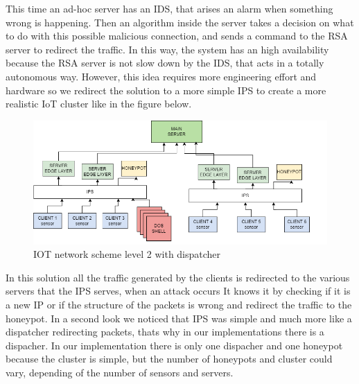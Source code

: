 This time an ad-hoc server has an IDS, that arises an alarm when something wrong is happening. Then an algorithm inside the server takes a decision on what to do with this possible malicious connection, and sends a command to the RSA server to redirect the traffic. In this way, the system has an high availability because the RSA server is not slow down by the IDS, that acts in a totally autonomous way. However, this idea requires more engineering effort and hardware so we redirect the solution to a more simple IPS to create a more realistic IoT cluster like in the figure below. 
\begin{figure}[h!]
  \centering
  \includegraphics[width = 15cm]{images/IOTlevel2IPS.drawio.png}
  \caption{IOT network scheme level 2 with dispatcher}
  \label{fig:3period}
\end{figure}
\FloatBarrier
 In this solution all the traffic generated by the clients is redirected to the various servers that the IPS serves, when an attack occurs It knows it by checking if it is a new IP or if the structure of the packets is wrong and redirect the traffic to the honeypot. 
In a second look we noticed that IPS was simple and much more like a dispatcher redirecting packets, thats why in our implementations there is a dispacher. In our implementation there is only one dispacher and one honeypot because the cluster is simple, but the number of honeypots and cluster could vary, depending of the number of sensors and servers.










